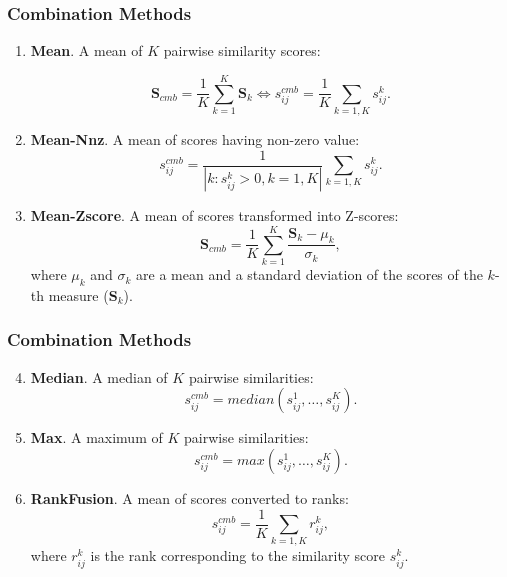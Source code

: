 \documentclass{beamer}
\begin{document}
\begin{frame}
\frametitle{Combination Methods}

\begin{enumerate}
  
\item \textbf{Mean}. A mean of $K$ pairwise similarity scores:

$$\mathbf{S}_{cmb} = \frac{1}{K} \sum_{k=1}^K \mathbf{S}_k \Leftrightarrow 
s_{ij}^{cmb}= \frac{1}{K}\sum_{k=1,K} s_{ij}^k.$$

\item \textbf{Mean-Nnz}. A mean of scores having non-zero value:
 $$s_{ij}^{cmb}= \frac{1}{|k:s_{ij}^k
>0,k=1,K|}\sum_{k=1,K} s_{ij}^k.$$

\item \textbf{Mean-Zscore}. A mean of scores
transformed into Z-scores:
$$\mathbf{S}_{cmb} = \frac{1}{K} \sum_{k=1}^K \frac{\mathbf{S}_k -
\mu_k}{\sigma_k},$$ where $\mu_k$ and $\sigma_k$ are a mean and a standard deviation of the scores of the $k$-th measure ($\mathbf{S}_k$).

\end{enumerate}
\end{frame}



\begin{frame}
\frametitle{Combination Methods}

\begin{enumerate}
  \setcounter{enumi}{3}
\item \textbf{Median}. A median of $K$ pairwise similarities:
$$s_{ij}^{cmb}= median(s_{ij}^1,\ldots,s_{ij}^K). $$

\item \textbf{Max}. A maximum of $K$ pairwise similarities:
$$s_{ij}^{cmb}= max(s_{ij}^1,\ldots,s_{ij}^K).$$

\item \textbf{RankFusion}. A mean of scores converted to ranks:
 $$s_{ij}^{cmb}= \frac{1}{K}\sum_{k=1,K}
r_{ij}^k,$$
where  $r^k_{ij}$ is the rank corresponding to the similarity score $s^k_{ij}$.
\end{enumerate}

\end{frame}
\end{document}
